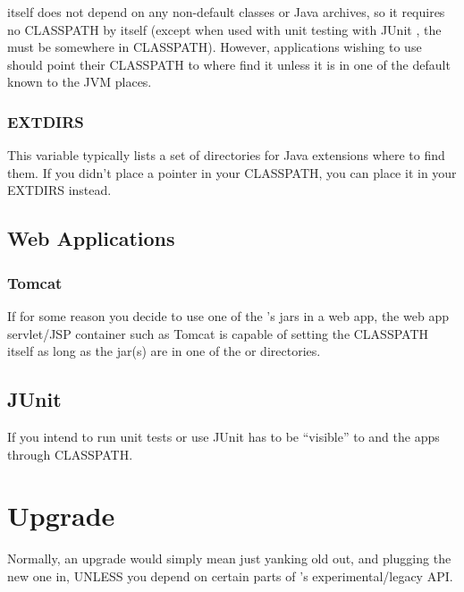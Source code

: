 {\marf} itself does not depend on any non-default classes or
Java archives, so it requires no CLASSPATH by itself (except when used
with unit testing with JUnit \cite{junit}, the  must
be somewhere in CLASSPATH). However,
applications wishing to use {\marf} should point their CLASSPATH
to where find it unless it is in one of the default known to the JVM
places.

\subsubsection{EXTDIRS}

This variable typically lists a set of directories for Java
extensions where to find them. If you didn't place a pointer
in your CLASSPATH, you can place it in your EXTDIRS instead.

\subsection{Web Applications}

\subsubsection{Tomcat}

If for some reason you decide to use one of the {\marf}'s jars
in a web app, the web app servlet/JSP container such as Tomcat
\cite{tomcat} is capable of setting the CLASSPATH itself as long
as the jar(s) are in one of the  or 
 directories.

\subsection{JUnit}

If you intend to run unit tests or use  
JUnit \cite{junit} has to be ``visible'' to {\marf} and the apps
through CLASSPATH.


\section{{\marf} Upgrade}

Normally, an upgrade would simply mean just yanking old  out,
and plugging the new one in, UNLESS you depend on certain parts
of {\marf}'s experimental/legacy API.


